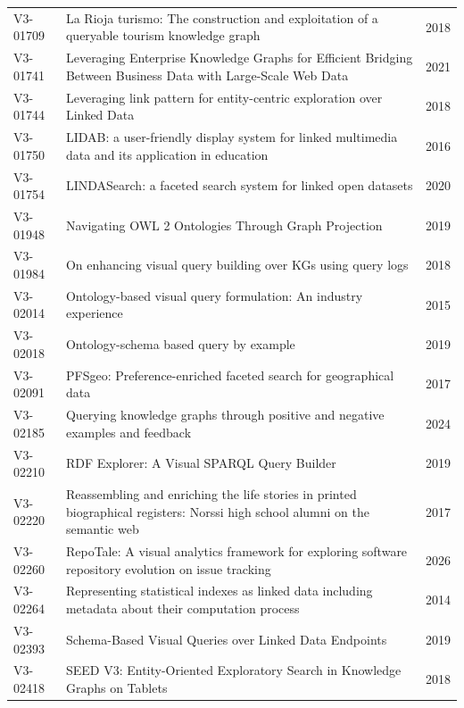 \documentclass[manuscript,review,screen]{acmart}
\begin{document}
\begin{longtable}{@{}L{21mm}L{107mm}L{17mm}@{}}
V3-01709 & La Rioja turismo: The construction and exploitation of a queryable tourism knowledge graph & 2018 \citep{V3-01709}\\
V3-01741 & Leveraging Enterprise Knowledge Graphs for Efficient Bridging Between Business Data with Large-Scale Web Data & 2021 \citep{V3-01741}\\
V3-01744 & Leveraging link pattern for entity-centric exploration over Linked Data & 2018 \citep{V3-01744}\\
V3-01750 & LIDAB: a user-friendly display system for linked multimedia data and its application in education & 2016 \citep{V3-01750}\\
V3-01754 & LINDASearch: a faceted search system for linked open datasets & 2020 \citep{V3-01754}\\
V3-01948 & Navigating OWL 2 Ontologies Through Graph Projection & 2019 \citep{V3-01948}\\
V3-01984 & On enhancing visual query building over KGs using query logs & 2018 \citep{V3-01984}\\
V3-02014 & Ontology-based visual query formulation: An industry experience & 2015 \citep{V3-02014}\\
V3-02018 & Ontology-schema based query by example & 2019 \citep{V3-02018}\\
V3-02091 & PFSgeo: Preference-enriched faceted search for geographical data & 2017 \citep{V3-02091}\\
V3-02185 & Querying knowledge graphs through positive and negative examples and feedback & 2024 \citep{V3-02185}\\
V3-02210 & RDF Explorer: A Visual SPARQL Query Builder & 2019 \citep{V3-02210}\\
V3-02220 & Reassembling and enriching the life stories in printed biographical registers: Norssi high school alumni on the semantic web & 2017 \citep{V3-02220}\\
V3-02260 & RepoTale: A visual analytics framework for exploring software repository evolution on issue tracking & 2026 \citep{V3-02260}\\
V3-02264 & Representing statistical indexes as linked data including metadata about their computation process & 2014 \citep{V3-02264}\\
V3-02393 & Schema-Based Visual Queries over Linked Data Endpoints & 2019 \citep{V3-02393}\\
V3-02418 & SEED V3: Entity-Oriented Exploratory Search in Knowledge Graphs on Tablets & 2018 \citep{V3-02418}\\

\end{longtable}
\end{document}
